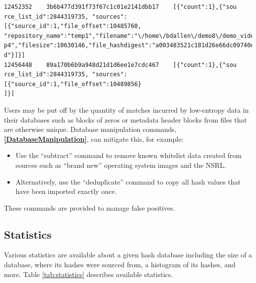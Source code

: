 \documentclass[11pt,fleqn]{article} %
\begin{document}
\begin{lstlisting}[float, caption={Two lines from the \texttt{identified\_sources.txt} file produced by post-processing the \texttt{identified\_blocks.txt} file. The third column is replaced with expaned information}, label=identifiedSourceLine]
12452352	3b6b477d391f73f67c1c01e2141dbb17	[{"count":1},{"sou
rce_list_id":2844319735, "sources":[{"source_id":1,"file_offset":10485760,
"repository_name":"temp1","filename":"\/home\/bdallen\/demo8\/demo_video.m
p4","filesize":10630146,"file_hashdigest":"a003483521c181d26e66dc09740e939
d"}]}]
12456448	89a170b6b9a948d21d1d6ee1e7cdc467	[{"count":1},{"sou
rce_list_id":2844319735, "sources":[{"source_id":1,"file_offset":10489856}
]}]
\end{lstlisting}

Users may be put off by the quantity of matches incurred by low-entropy data in their databases such as blocks of zeros or metadata header blocks from files that are otherwise unique. Database manipulation commands,
\textbf{\autoref{DatabaseManipulation}}, can mitigate this, for example:
\begin{itemize}
\item Use the ``subtract'' command to remove known whitelist data created from sources such as ``brand new'' operating system images and the NSRL.
\item Alternatively, use the ``deduplicate'' command to copy all hash values that have been imported exactly once.
\end{itemize}
These commands are provided to manage false positives.

\subsection{Statistics}
Various statistics are available about a given hash database including the size of a database, where its hashes were sourced from, a histogram of its hashes, and more.
Table \ref{tab:statistics} describes available statistics.\\
\end{document}
